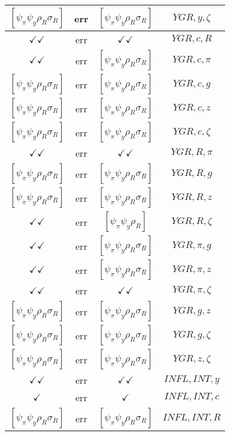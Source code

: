 \documentclass[a4paper,10pt]{article}
\begin{document}
\begin{longtable}{|c|c|c|c|}
\hline
$[\psi_\pi \psi_y \rho_R \sigma_R ]$ & err & $[\psi_\pi \psi_y \rho_R \sigma_R ]$ & ${YGR},{y},{\zeta}$ \\
\hline
$\checkmark\checkmark$ & err & $\checkmark\checkmark$ & ${YGR},{c},{R}$ \\
\hline
$\checkmark\checkmark$ & err & $[\psi_\pi \psi_y \rho_R \sigma_R ]$ & ${YGR},{c},{\pi}$ \\
\hline
$[\psi_\pi \psi_y \rho_R \sigma_R ]$ & err & $[\psi_\pi \psi_y \rho_R \sigma_R ]$ & ${YGR},{c},{g}$ \\
\hline
$[\psi_\pi \psi_y \rho_R \sigma_R ]$ & err & $[\psi_\pi \psi_y \rho_R \sigma_R ]$ & ${YGR},{c},{z}$ \\
\hline
$[\psi_\pi \psi_y \rho_R \sigma_R ]$ & err & $[\psi_\pi \psi_y \rho_R \sigma_R ]$ & ${YGR},{c},{\zeta}$ \\
\hline
$\checkmark\checkmark$ & err & $\checkmark\checkmark$ & ${YGR},{R},{\pi}$ \\
\hline
$[\psi_\pi \psi_y \rho_R \sigma_R ]$ & err & $[\psi_\pi \psi_y \rho_R \sigma_R ]$ & ${YGR},{R},{g}$ \\
\hline
$[\psi_\pi \psi_y \rho_R \sigma_R ]$ & err & $[\psi_\pi \psi_y \rho_R \sigma_R ]$ & ${YGR},{R},{z}$ \\
\hline
$\checkmark\checkmark$ & err & $[\psi_\pi \psi_y \rho_R ]$ & ${YGR},{R},{\zeta}$ \\
\hline
$\checkmark\checkmark$ & err & $[\psi_\pi \psi_y \rho_R \sigma_R ]$ & ${YGR},{\pi},{g}$ \\
\hline
$\checkmark\checkmark$ & err & $[\psi_\pi \psi_y \rho_R \sigma_R ]$ & ${YGR},{\pi},{z}$ \\
\hline
$\checkmark\checkmark$ & err & $\checkmark\checkmark$ & ${YGR},{\pi},{\zeta}$ \\
\hline
$[\psi_\pi \psi_y \rho_R \sigma_R ]$ & err & $[\psi_\pi \psi_y \rho_R \sigma_R ]$ & ${YGR},{g},{z}$ \\
\hline
$[\psi_\pi \psi_y \rho_R \sigma_R ]$ & err & $[\psi_\pi \psi_y \rho_R \sigma_R ]$ & ${YGR},{g},{\zeta}$ \\
\hline
$[\psi_\pi \psi_y \rho_R \sigma_R ]$ & err & $[\psi_\pi \psi_y \rho_R \sigma_R ]$ & ${YGR},{z},{\zeta}$ \\
\hline
$\checkmark\checkmark$ & err & $\checkmark\checkmark$ & ${INFL},{INT},{y}$ \\
\hline
$\checkmark$ & err & $\checkmark$ & ${INFL},{INT},{c}$ \\
\hline
$[\psi_\pi \psi_y \rho_R \sigma_R ]$ & err & $[\psi_\pi \psi_y \rho_R \sigma_R ]$ & ${INFL},{INT},{R}$ \\

\end{longtable}
\end{document}
